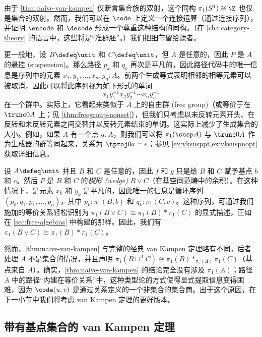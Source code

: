 {由于 \cref{thm:naive-van-kampen} 仅断言集合族的双射，这个同构 $\pi_1(S^1)\cong \Z$ 也仅是集合的双射。然而，我们可以在 $\code$ 上定义一个连接运算（通过连接序列），并证明 $\encode$ 和 $\decode$ 形成一个尊重这种结构的同构。（在 \cref{cha:category-theory} 的语言中，这些将是“准群胚”。）我们把细节留给读者。

%

\begin{eg}\label{eg:suspension}
更一般地，设 $B\defeq\unit$ 和 $C\defeq \unit$，但 $A$ 是任意的，因此 $P$ 是 $A$ 的悬挂 (suspension)。那么路径 $p_k$ 和 $q_k$ 再次是平凡的，因此路径代码中的唯一信息是序列中的元素 $x_1,y_1,\dots,x_n,y_n: A$。前两个生成等式表明相邻的相等元素可以被取消，因此可以将此序列视为如下形式的单词
\[ x_1 y_1^{-1} x_2 y_2^{-1} \cdots x_n y_n^{-1} \]
在一个群中。实际上，它看起来类似于 $A$ 上的自由群 (free group)（或等价于在 $\trunc0A$ 上；见 \cref{thm:freegroup-nonset}），但我们只考虑以未反转元素开头、在反转和未反转元素之间交替并以反转元素结束的单词。这实际上减少了生成集合的大小。例如，如果 $A$ 有一个点 $a:A$，则我们可以将 $\pi_1(\susp A)$ 与 $\trunc0A$ 作为生成器的群等同起来，关系为 $\tproj0a = e$；参见 \cref{ex:vksusppt,ex:vksuspnopt} 获取详细信息。
\end{eg}

\begin{eg}\label{eg:wedge}
设 $A\defeq\unit$ 并且 $B$ 和 $C$ 是任意的，因此 $f$ 和 $g$ 只是给 $B$ 和 $C$ 赋予基点 $b$ 和 $c$。然后 $P$ 是 $B$ 和 $C$ 的\emph{楔形 (wedge)} $B\vee C$（在基空间范畴中的余积）。在这种情况下，是元素 $x_k$ 和 $y_k$ 是平凡的，因此唯一的信息是循环序列 $(p_0,q_1,p_1,\dots,p_n)$，其中 $p_k:\pi_1(B,b)$ 和 $q_k:\pi_1(C,c)$。这种序列，可通过我们施加的等价关系轻松识别为 $\pi_1(B\vee C) \cong \pi_1(B) * \pi_1(C)$ 的显式描述，正如在 \cref{sec:free-algebras} 中构建的那样。因此，我们有 $\pi_1(B\vee C) \cong \pi_1(B) * \pi_1(C)$。
\end{eg}

%

然而，\cref{thm:naive-van-kampen} 与完整的经典 van Kampen 定理略有不同，后者处理 $A$ 不是集合的情况，并且声明 $\pi_1(B\sqcup^A C) \cong \pi_1(B) *_{\pi_1(A)} \pi_1(C)$（基点来自 $A$）。确实，\cref{thm:naive-van-kampen} 的结论完全没有涉及 $\pi_1(A)$；路径 $A$ 中的路径“内建在等价关系”中，这种类型论的方式使得显式提取信息变得困难，因为 $\code(u,v)$ 是通过关系定义的一个非集合的集合商。出于这个原因，在下一小节中我们将考虑 van Kampen 定理的更好版本。

\subsection{带有基点集合的 van Kampen 定理}
\label{sec:better-vankampen}

}
